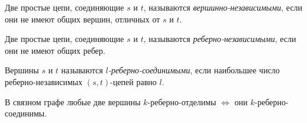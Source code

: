 \begin{definition}
    Две простые цепи, соединяющие $ s $ и $ t $, называются \emph{вершинно-независимыми}, если они не имеют общих вершин, отличных от $ s $ и $ t $.
\end{definition}

\begin{definition}
    Две простые цепи, соединяющие $ s $ и $ t $, называются \emph{реберно-независимыми}, если они не имеют общих ребер.
\end{definition}

\begin{definition}
    Вершины $ s $ и $ t $ называются \emph{$ l $-реберно-соединимыми}, если наибольшее число \\ реберно-независимых $ (s,t) $-цепей равно $ l $.
\end{definition}

\begin{theorem}
    В связном графе любые две вершины $ k $-реберно-отделимы $ \iff $ они $ k $-реберно-соединимы.
\end{theorem}